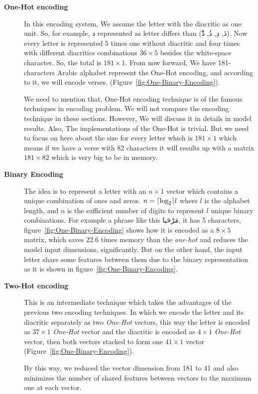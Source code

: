 \newpage

\begin{description}

\item[\textbf{One-Hot encoding}] In this encoding system, We assume the letter with the diacritic as one unit. So, for example, \textarabic{د} represented as letter differs than (\textarabic{دَ, دِ, دُ, دْْ}). Now every letter is represented 5 times one without diacritic and four times with different diacritics combinations $36 \times 5$ besides the white-space character. So, the total is $181 \times 1$. From now forward, We have 181-characters Arabic alphabet represent the One-Hot encoding, and according to it, we will encode verses. (Figure~\ref{fig:One-Binary-Encoding}).

We need to mention that, One-Hot encoding technique is of the famous techniques in encoding problem. We will not compare the encoding technique in these sections. However, We will discuss it in details in model results. Also, The implementations of the One-Hot is trivial. But we need to focus on here about the size for every letter which is $181 \times 1$ which means if we have a verse with 82 characters it will results up with a matrix $181 \times 82$ which is very big to be in memory.

\item[\textbf{Binary Encoding}] The idea is to represent a letter with an $n \times 1$ vector which contains a unique combination of ones and zeros.  $n =\ceil*{\log_2} l$ where $l$ is the alphabet length, and $n$ is the sufficient number of digits to represent $l$ unique binary combinations.  For example a phrase like this \textarabic{مَرْحَبا}, it has 5 characters, figure~\ref{fig:One-Binary-Encoding} shows how it is encoded as a $8 \times 5$ matrix, which saves 22.6 times memory than the \textit{one-hot} and reduces the model input dimensions, significantly. But on the other hand, the input letter share some features between them due to the binary representation as it is shown in figure~\ref{fig:One-Binary-Encoding}.

\item[\textbf{Two-Hot encoding}] This is an intermediate technique which takes the advantages of the previous two encoding techniques. In which we encode the letter and its diacritic separately as two \textit{One-Hot} vectors, this way the letter is encoded as $37 \times 1$ \textit{One-Hot} vector and the diacritic is encoded as $4 \times 1$ \textit{One-Hot} vector, then both vectors stacked to form one $41 \times 1$ vector (Figure~\ref{fig:One-Binary-Encoding}).

By this way, we reduced the vector dimension from 181 to 41 and also minimizes the number of shared features between vectors to the maximum one at each vector. 
\end{description}




